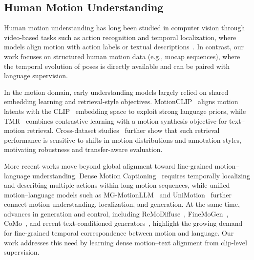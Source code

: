 \subsection{Human Motion Understanding}
Human motion understanding has long been studied in computer vision through video-based tasks such as action recognition and temporal localization, where models align motion with action labels or textual descriptions~\cite{bertasius2021space,arnab2021vivit,nag2022proposal,feichtenhofer2022masked}. In contrast, our work focuses on structured human motion data (e.g., mocap sequences), where the temporal evolution of poses is directly available and can be paired with language supervision.

In the motion domain, early understanding models largely relied on shared embedding learning and retrieval-style objectives. MotionCLIP~\cite{tevet2022motionclip} aligns motion latents with the CLIP~\cite{radford2021learning} embedding space to exploit strong language priors, while TMR~\cite{petrovich2023tmr} combines contrastive learning with a motion synthesis objective for text--motion retrieval. Cross-dataset studies~\cite{bensabath2024cross} further show that such retrieval performance is sensitive to shifts in motion distributions and annotation styles, motivating robustness and transfer-aware evaluation.

More recent works move beyond global alignment toward fine-grained motion--language understanding. Dense Motion Captioning~\cite{xudense} requires temporally localizing and describing multiple actions within long motion sequences, while unified motion--language models such as MG-MotionLLM~\cite{wu2025mg} and UniMotion~\cite{li2025unimotion} further connect motion understanding, localization, and generation. At the same time, advances in generation and control, including ReMoDiffuse~\cite{zhang2023remodiffuse}, FineMoGen~\cite{zhang2023finemogen}, CoMo~\cite{huang2024controllable}, and recent text-conditioned generators~\cite{zhang2023generating,guo2024momask,meng2025rethinking,Zhao:DartControl:2025,barquero2024seamless,sun2024coma,jiang2023motiongpt,pinyoanuntapong2024mmm,dang2026segmo}, highlight the growing demand for fine-grained temporal correspondence between motion and language. Our work addresses this need by learning dense motion--text alignment from clip-level supervision.

